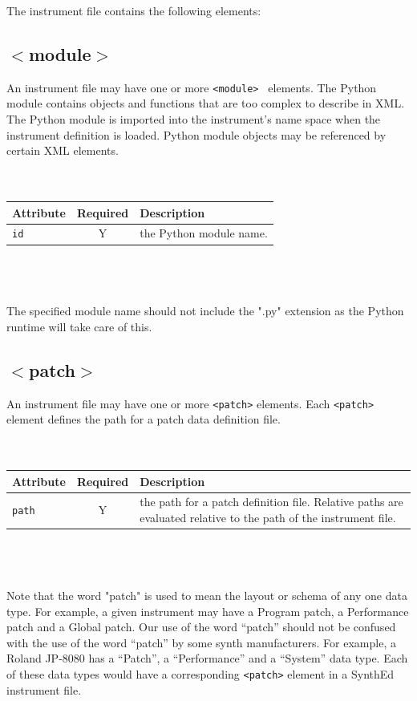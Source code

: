 \documentclass[a4paper,twoside,12pt]{article}
\newcommand{\code}[1]{\color{red}\texttt{#1}\color{black}}
\begin{document}
The instrument file contains the following elements:

\subsection{$<$module$>$}
An instrument file may have one or more \code{<module> } elements.
The Python module contains objects and functions that are too
complex to describe in XML. The Python module is imported into the
instrument's name space when the instrument definition is loaded.
Python module objects may be referenced by certain XML elements.\\
\\
\\
\begin{tabular}{|l|c|p{9cm}|}
\hline
Attribute & Required & Description \\
\hline
\code{id} & Y & the Python module name. \\
\hline
\end{tabular}
\\
\\
\\

The specified module name should not include the ".py" extension
as the Python runtime will take care of this.

\subsection{$<$patch$>$}
An instrument file may have one or more \code{<patch>}{} elements.
Each \code{<patch>}{} element defines the path for a patch data
definition file.
\\
\\
\\
\begin{tabular}{|l|c|p{9cm}|}
\hline
Attribute & Required & Description \\
\hline \code{path} & Y & the path for a patch definition file.
Relative paths are evaluated relative to the path of the instrument file. \\
\hline
\end{tabular}
\\
\\
\\
Note that the word "patch" is used to mean the layout or schema of
any one data type. For example, a given instrument may have a
Program patch, a Performance patch and a Global patch. Our use of
the word ``patch'' should not be confused with the use of the word
``patch'' by some synth manufacturers. For example, a Roland
JP-8080 has a ``Patch'', a ``Performance'' and a ``System'' data
type. Each of these data types would have a corresponding
\code{<patch>}{} element in a SynthEd instrument file.
\end{document}
